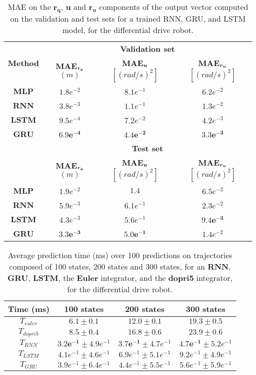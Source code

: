 \begin{table}[t]
\centering
\begin{tabular}{ | c | c  c  c | }
\hline
    \multirow{2}{*}{\textbf{Method}} & \multicolumn{3}{c|}{\textbf{Validation set}} \\ \cline{2-4}
    & \textbf{MAE$_{\boldsymbol{r_q}}$} $(m)$  & \textbf{MAE$_{\boldsymbol{u}}$} $[(rad/s)^2]$ & \textbf{MAE$_{\boldsymbol{r_u}}$} $[(rad/s)^2]$ \\ \hline
{\textbf{MLP}} & $1.8e^{-2}$ & $8.1e^{-1}$ & $6.2e^{-2}$ \\ 
{\textbf{RNN}} & $3.8e^{-3}$ & $1.1e^{-1}$ & $1.3e^{-2}$ \\ 
{\textbf{LSTM}} & $9.5e^{-4}$ & $7.2e^{-2}$ & $4.2e^{-3}$ \\ 
{\textbf{GRU}} & $\boldsymbol{6.9e^{-4}}$ & $\boldsymbol{4.4e^{-2}}$ & $\boldsymbol{3.3e^{-3}}$ \\ 
\hline
    & \multicolumn{3}{c|}{\textbf{Test set}}\\ \cline{2-4}
    & \textbf{MAE$_{\boldsymbol{r_q}}$} $(m)$  & \textbf{MAE$_{\boldsymbol{u}}$} $[(rad/s)^2]$ & \textbf{MAE$_{\boldsymbol{r_u}}$} $[(rad/s)^2]$ \\ \hline
{\textbf{MLP}} & $1.9e^{-2}$ & $1.4$ & $6.5e^{-2}$ \\ 
{\textbf{RNN}} &  $5.9e^{-3}$ & $6.1e^{-1}$ & $2.3e^{-2}$ \\ 
{\textbf{LSTM}} & $4.3e^{-3}$ & $5.6e^{-1}$ & $\boldsymbol{9.4e^{-3}}$ \\ 
{\textbf{GRU}} & $\boldsymbol{3.3e^{-3}}$ & $5\boldsymbol{.0e^{-1}}$ & $1.4e^{-2}$ \\ 
\hline
\end{tabular}
\caption{
MAE on the $\boldsymbol{r_q}$, $\boldsymbol{u}$ and $\boldsymbol{r_u}$ components of the output vector computed on the validation and test sets for a trained RNN, GRU, and LSTM model, for the differential drive robot.}
    \label{tab:NN_results_table_Q_unic}
\end{table}

\begin{table}[t]
\centering
\begin{tabular}{ | c | c  c  c | }
\hline
    \textbf{Time (ms)} & 100 states  & 200 states & 300 states \\ \hline
    $T_{euler}$ & $6.1 \pm 0.1$ & $12.0 \pm 0.1$ & $19.3 \pm 0.5$ \\ 
$T_{dopri5}$ & $8.5 \pm 0.4$ & $16.8 \pm 0.6$ & $23.9 \pm 0.6$ \\ 
$T_{RNN}$ & $\boldsymbol{3.2e^{-1}} \pm 4.9e^{-1}$ & $\boldsymbol{3.7e^{-1}} \pm 4.7e^{-1}$ & $\boldsymbol{4.7e^{-1}} \pm 5.2e^{-1}$ \\ 
$T_{LSTM}$ & $4.1e^{-1} \pm 4.6e^{-1}$ & $6.9e^{-1} \pm 5.1e^{-1}$ & $9.2e^{-1} \pm 4.9e^{-1}$ \\ 
$T_{GRU}$ & $3.9e^{-1} \pm 6.4e^{-1}$ & $4.4e^{-1} \pm 5.5e^{-1}$ & $5.6e^{-1} \pm 5.9e^{-1}$  \\ \hline
\end{tabular}
\caption{
Average prediction time (ms) over 100 predictions on trajectories composed of 100 states, 200 states and 300 states, for an \textbf{RNN}, \textbf{GRU}, \textbf{LSTM}, the \textbf{Euler} integrator, and the \textbf{dopri5} integrator, for the differential drive robot.}
    \label{tab:timepred_unic}
\end{table}